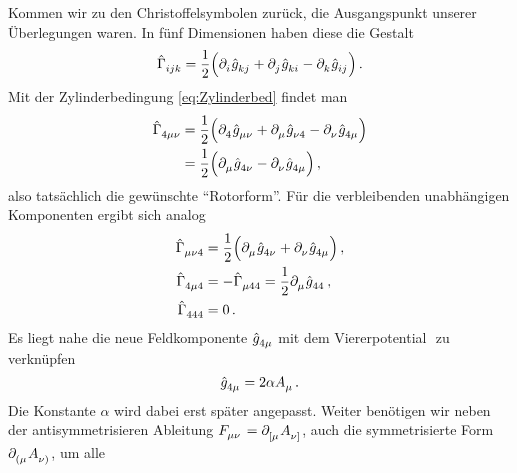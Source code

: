 Kommen wir zu den Christoffelsymbolen zurück, die 
Ausgangspunkt unserer Überlegungen waren. In fünf Dimensionen haben diese die
Gestalt
\begin{equation}
\tensor*{\hat{\Gamma}}{_i_j_k}=\frac{1}{2}
\left(\tensor{\partial}{_i}
\tensor{\hat{g}}{_k_j}+\tensor{\partial}{_j} \tensor{\hat{g}}{_k_i} -
\tensor{\partial}{_k} \tensor{\hat{g}}{_i_j}\right)\, .
\end{equation}
Mit der Zylinderbedingung \eqref{eq:Zylinderbed} findet man 
\begin{equation}
\begin{split}
\tensor*{\hat{\Gamma}}{_4_\mu_\nu}&=\frac{1}{2}
	\left(\tensor{\partial}{_4}\tensor{\hat{g}}{_\mu_\nu} 
+ 	\tensor{\partial}{_\mu}\tensor{\hat{g}}{_\nu_4} 
- 	\tensor{\partial}{_\nu}\tensor{\hat{g}}{_4_\mu}\right)\\
&=\frac{1}{2}
\left(\tensor{\partial}{_\mu}
\tensor{\hat{g}}{_4_\nu} - \tensor{\partial}{_\nu}
\tensor{\hat{g}}{_4_\mu}\right)\,,
\end{split}
\end{equation}
also tatsächlich die gewünschte \enquote{Rotorform}. 
Für die verbleibenden unabhängigen Komponenten ergibt sich analog
\begin{align}
\tensor*{\hat{\Gamma}}{_\mu_\nu_4}&=\frac{1}{2}
\left(\tensor{\partial}{_\mu}
\tensor{\hat{g}}{_4_\nu}+\tensor{\partial}{_\nu}
\tensor{\hat{g}}{_4_\mu}\right)\,,\\
\tensor*{\hat{\Gamma}}{_4_\mu_4}&=-\tensor*{\hat{\Gamma}}{_\mu_4_4}=\frac{1}{2}\tensor{\partial}{_\mu}
\tensor{\hat{g}}{_4_4}\,,\\
\tensor*{\hat{\Gamma}}{_4_4_4}&= 0\,.
\end{align}
Es liegt nahe die neue
Feldkomponente
$\tensor{\hat{g}}{_4_\mu}$ mit
dem Viererpotential $ $ zu verknüpfen
\begin{equation}
\tensor{\hat{g}}{_4_\mu}=2\alpha\tensor{A}{_\mu}\,.
\end{equation}
Die Konstante $\alpha$ wird dabei erst später angepasst.
 Weiter benötigen wir neben der antisymmetrisieren
Ableitung $\tensor{F}{_\mu_\nu}=\tensor{\partial}{_{[\mu}}\tensor{A}{_{\nu]}}$, auch die
symmetrisierte Form $\tensor{\partial}{_{(\mu}}\tensor{A}{_{\nu)}}$, um alle
